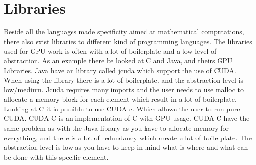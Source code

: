 \section{Libraries}
Beside all the languages made specificity aimed at mathematical computations, there also exist libraries to different kind of programming languages.
The libraries used for GPU work is often with a lot of boilerplate and a low level of abstraction.
As an example there be looked at C and Java, and theirs GPU Libraries.
Java have an library called jcuda which support the use of CUDA.
When using the library there is a lot of boilerplate, and the abstraction level is low/medium\citep{Java_library}. 
Jcuda requires many imports and the user needs to use malloc to allocate a memory block for each element which result in a lot of boilerplate.\citep{Java_malloc}
Looking at C it is possible to use CUDA c. Which allows the user to run pure CUDA.
CUDA C is an implementation of C with GPU usage.
CUDA C have the same problem as with the Java library as you have to allocate memory for everything, and there is a lot of redundancy which create a lot of boilerplate.
The abstraction level is low as you have to keep in mind what is where and what can be done with this specific element.\citep{C_CUDA}


